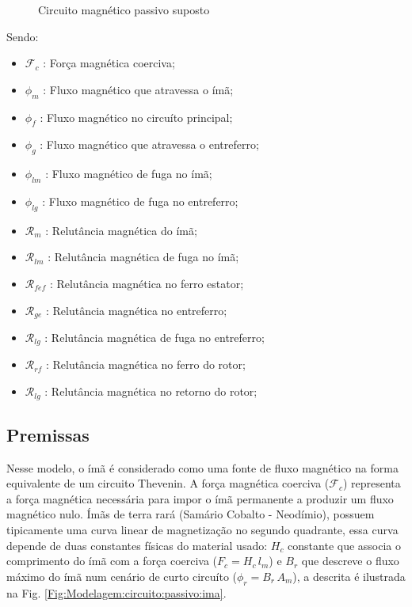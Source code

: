 \begin{figure}[!ht]
	\centering
	\def\svgwidth{1\columnwidth}
	
	\caption{Circuito magnético passivo suposto}
	\label{Fig:Modelagem:circuito:passivo:umlado}
\end{figure}


Sendo:
\begin{itemize}
	\item $\mathcal{F}_c$ :  Força magnética coerciva;
	\item $\phi_m$ : Fluxo magnético que atravessa o ímã;
	\item $\phi_f$ : Fluxo magnético no circuíto principal;
	\item $\phi_g$ : Fluxo magnético que atravessa o entreferro;
	\item $\phi_{lm}$ : Fluxo magnético de fuga no ímã;
	\item $\phi_{lg}$ : Fluxo magnético de fuga no entreferro;
	\item $\mathcal{R}_m$ : Relutância magnética do ímã;
	\item $\mathcal{R}_{lm}$ : Relutância magnética de fuga no ímã;
	\item $\mathcal{R}_{fef}$ : Relutância magnética no ferro estator;
	\item $\mathcal{R}_{ge}$ : Relutância magnética no entreferro;
	\item $\mathcal{R}_{lg}$ : Relutância magnética de fuga no entreferro;
	\item $\mathcal{R}_{rf}$ : Relutância magnética no ferro do rotor;
	\item $\mathcal{R}_{lg}$ : Relutância magnética no retorno do rotor;
\end{itemize}

\subsection{Premissas}

Nesse modelo, o ímã é considerado como uma fonte de fluxo magnético na forma equivalente de um circuito Thevenin. A força magnética coerciva ($\mathcal{F}_c$) representa a força magnética necessária para impor o ímã permanente a produzir um fluxo magnético nulo. Ímãs de terra rará (Samário Cobalto - Neodímio), possuem tipicamente uma curva linear de magnetização no segundo quadrante, essa curva depende de duas constantes físicas do material usado: $H_c$ constante que associa o comprimento do ímã com a força coerciva ($ F_c = H_c \, l_m$) e $B_r$ que descreve o fluxo máximo do ímã num cenário de curto circuíto ($\phi_r = B_r \, A_m$), a descrita é ilustrada na Fig. \ref{Fig:Modelagem:circuito:passivo:ima}.

